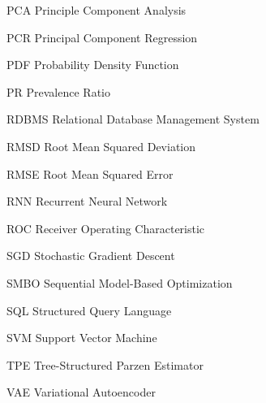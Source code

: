 \begin{symbollist}
  \item[PCA] Principle Component Analysis
  \item[PCR] Principal Component Regression
  \item[PDF] Probability Density Function
  \item[PR] Prevalence Ratio
  \item[RDBMS] Relational Database Management System
  \item[RMSD] Root Mean Squared Deviation
  \item[RMSE] Root Mean Squared Error
  \item[RNN] Recurrent Neural Network
  \item[ROC] Receiver Operating Characteristic
  \item[SGD] Stochastic Gradient Descent
  \item[SMBO] Sequential Model-Based Optimization
  \item[SQL] Structured Query Language
  \item[SVM] Support Vector Machine
  \item[TPE] Tree-Structured Parzen Estimator
  \item[VAE] Variational Autoencoder
\end{symbollist}
